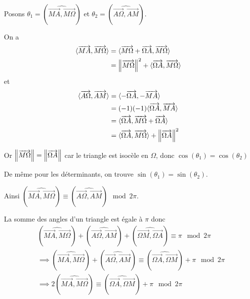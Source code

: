 \documentclass[a4paper, 12pt]{article}
\begin{document}
\begin{demonstration}
    Posons $\theta_1 = (\widehat{\overrightarrow{MA}, \overrightarrow{M\Omega}})$
    et $\theta_2 = (\widehat{\overrightarrow{A \Omega}, \overrightarrow{A M}})$.

    On a
    \begin{align*}
        \langle\overrightarrow{MA}, \overrightarrow{M\Omega}\rangle &= \langle\overrightarrow{M\Omega} + \overrightarrow{\Omega A}, \overrightarrow{M\Omega}\rangle \\
        &= \left\lVert\overrightarrow{M\Omega}\right\rVert^2 + \langle\overrightarrow{\Omega A}, \overrightarrow{M\Omega}\rangle
    \end{align*}
    et
    \begin{align*}
        \langle\overrightarrow{A \Omega}, \overrightarrow{A M}\rangle &= \langle-\overrightarrow{\Omega A}, -\overrightarrow{M A}\rangle \\
        &= (-1)(-1)\langle\overrightarrow{\Omega A}, \overrightarrow{M A}\rangle \\
        &= \langle\overrightarrow{\Omega A}, \overrightarrow{M\Omega} + \overrightarrow{\Omega A}\rangle \\
        &= \langle\overrightarrow{\Omega A}, \overrightarrow{M\Omega}\rangle + \left\lVert\overrightarrow{\Omega A}\right\rVert^2
    \end{align*}

    Or $\left\lVert\overrightarrow{M\Omega}\right\rVert = \left\lVert\overrightarrow{\Omega A}\right\rVert$ car le triangle est isocèle en $\Omega$, donc $\cos(\theta_1) = \cos(\theta_2)$

    De même pour les déterminants, on trouve $\sin(\theta_1) = \sin(\theta_2)$.

    Ainsi $(\widehat{\overrightarrow{MA}, \overrightarrow{M\Omega}}) \equiv (\widehat{\overrightarrow{A \Omega}, \overrightarrow{A M}}) \mod 2\pi$.

    La somme des angles d'un triangle est égale à $\pi$ donc
    \begin{align*}  
        &(\widehat{\overrightarrow{M A}, \overrightarrow{M\Omega}}) + (\widehat{\overrightarrow{A \Omega}, \overrightarrow{A M}}) + (\widehat{\overrightarrow{\Omega M}, \overrightarrow{\Omega A}}) \equiv \pi \mod 2\pi \\
        &\implies (\widehat{\overrightarrow{M A}, \overrightarrow{M\Omega}}) + (\widehat{\overrightarrow{A \Omega}, \overrightarrow{A M}}) \equiv (\widehat{\overrightarrow{\Omega A}, \overrightarrow{\Omega M}}) + \pi \mod 2\pi \\
        &\implies 2(\widehat{\overrightarrow{M A}, \overrightarrow{M\Omega}}) \equiv (\widehat{\overrightarrow{\Omega A}, \overrightarrow{\Omega M}}) + \pi \mod 2\pi
    \end{align*}
\end{demonstration}
\end{document}
